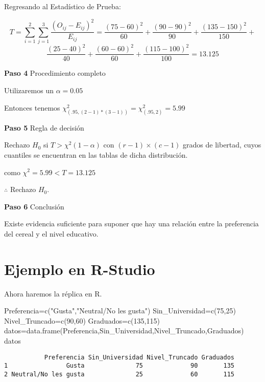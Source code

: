 \documentclass[
  a4paper,
  oneside,
  openany]{book}
\newenvironment{Shaded}{\begin{snugshade}}{\end{snugshade}}
\newcommand{\DecValTok}[1]{\textcolor[rgb]{0.00,0.00,0.81}{#1}}
\newcommand{\FunctionTok}[1]{\textcolor[rgb]{0.00,0.00,0.00}{#1}}
\newcommand{\NormalTok}[1]{#1}
\newcommand{\OtherTok}[1]{\textcolor[rgb]{0.56,0.35,0.01}{#1}}
\newcommand{\StringTok}[1]{\textcolor[rgb]{0.31,0.60,0.02}{#1}}
\begin{document}
Regresando al Estadístico de Prueba:

\[T=\sum_{i=1}^{2}\sum_{j=1}^{3}\frac{(O_{ij}-E_{ij})^2}{E_{ij}}= \frac{(75-60)^2}{60}+\frac{(90-90)^2}{90}+\frac{(135-150)^2}{150}+\]
\[\frac{(25-40)^2}{40}+\frac{(60-60)^2}{60}+\frac{(115-100)^2}{100}=13.125\]

\textbf{Paso 4} Procedimiento completo

Utilizaremos un \(\alpha=0.05\)

Entonces tenemos \(\chi^2_{(.95,(2-1)*(3-1))}=\chi^2_{(.95,2)}=5.99\)

\textbf{Paso 5} Regla de decisión

Rechazo \(H_0\) si \(T> \chi^2(1-\alpha)\) con \((r-1)\times(c-1)\) grados de libertad, cuyos cuantiles se encuentran en las tablas de dicha distribución.

como \(\chi^2=5.99 < T=13.125\)

\(\therefore\) Rechazo \(H_0\).

\textbf{Paso 6} Conclusión

Existe evidencia suficiente para suponer que hay una relación entre la preferencia del cereal y el nivel educativo.

\hypertarget{ejemplo-en-r-studio-10}{%
\section{Ejemplo en R-Studio}\label{ejemplo-en-r-studio-10}}

Ahora haremos la réplica en R.

\begin{Shaded}
\begin{Highlighting}[]
\NormalTok{Preferencia}\OtherTok{=}\FunctionTok{c}\NormalTok{(}\StringTok{"Gusta"}\NormalTok{,}\StringTok{"Neutral/No les gusta"}\NormalTok{)}
\NormalTok{Sin\_Universidad}\OtherTok{=}\FunctionTok{c}\NormalTok{(}\DecValTok{75}\NormalTok{,}\DecValTok{25}\NormalTok{)}
\NormalTok{Nivel\_Truncado}\OtherTok{=}\FunctionTok{c}\NormalTok{(}\DecValTok{90}\NormalTok{,}\DecValTok{60}\NormalTok{)}
\NormalTok{Graduados}\OtherTok{=}\FunctionTok{c}\NormalTok{(}\DecValTok{135}\NormalTok{,}\DecValTok{115}\NormalTok{)}
\NormalTok{datos}\OtherTok{=}\FunctionTok{data.frame}\NormalTok{(Preferencia,Sin\_Universidad,Nivel\_Truncado,Graduados)}
\NormalTok{datos}
\end{Highlighting}
\end{Shaded}

\begin{verbatim}
           Preferencia Sin_Universidad Nivel_Truncado Graduados
1                Gusta              75             90       135
2 Neutral/No les gusta              25             60       115
\end{verbatim}
\end{document}
